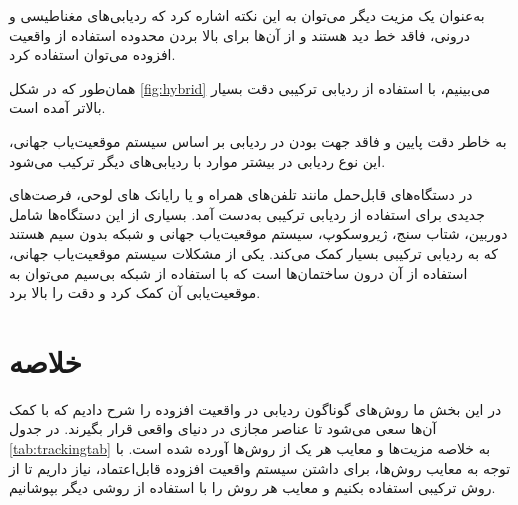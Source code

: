 به‌عنوان یک مزیت دیگر می‌توان به این نکته اشاره کرد که ردیابی‌های مغناطیسی و درونی، فاقد خط دید هستند و از آن‌ها برای بالا بردن محدوده استفاده از واقعیت افزوده می‌توان استفاده کرد. 

همان‌طور که در شکل \ref{fig:hybrid} می‌بینیم، با استفاده از ردیابی ترکیبی دقت بسیار بالاتر آمده است\cite{you1999orientation}.

به خاطر دقت پایین و فاقد جهت بودن در ردیابی بر اساس سیستم موقعیت‌یاب جهانی، این نوع ردیابی در بیشتر موارد با ردیابی‌های دیگر ترکیب می‌شود.

در دستگاه‌های قابل‌حمل مانند تلفن‌های همراه و یا رایانک های لوحی، فرصت‌های جدیدی برای استفاده از ردیابی ترکیبی به‌دست آمد. بسیاری از این دستگاه‌ها شامل دوربین، شتاب سنج، ژیروسکوپ، سیستم موقعیت‌یاب جهانی و شبکه بدون سیم هستند که به ردیابی ترکیبی بسیار کمک می‌کند. یکی از مشکلات سیستم موقعیت‌یاب جهانی، استفاده از آن درون ساختمان‌ها است که با استفاده از شبکه بی‌سیم می‌توان به موقعیت‌یابی آن کمک کرد و دقت را بالا برد\cite{duan2018augmented}.
\section{خلاصه}
در این بخش ما روش‌های گوناگون ردیابی در واقعیت افزوده را شرح دادیم که با کمک آن‌ها سعی می‌شود تا عناصر مجازی در دنیای واقعی قرار بگیرند. در جدول \ref{tab:trackingtab} به خلاصه مزیت‌ها و معایب هر یک از روش‌ها آورده شده است.
با توجه به معایب روش‌ها، برای داشتن سیستم واقعیت افزوده قابل‌اعتماد، نیاز داریم تا از روش ترکیبی استفاده بکنیم و معایب هر روش را با استفاده از روشی دیگر بپوشانیم.

